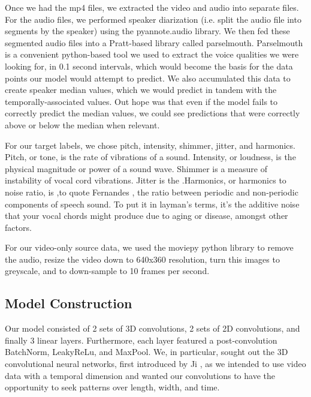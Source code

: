 \documentclass[10pt,twocolumn,letterpaper]{article}
\begin{document}
Once we had the mp4 files, we extracted the video and audio into separate files. For the audio files, we performed speaker diarization (i.e. split the audio file into segments by the speaker) using the pyannote.audio library\cite{Bredin23}. We then fed these segmented audio files into a Pratt\cite{Pratt}-based library called parselmouth\cite{Parselmouth}.  Parselmouth is a convenient python-based tool we used to extract the voice qualities we were looking for, in 0.1 second intervals, which would become the basis for the data points our model would attempt to predict. We also accumulated this data to create speaker median values, which we would predict in tandem with the temporally-associated values. Out hope was that even if the model fails to correctly predict the median values, we could see predictions that were correctly above or below the median when relevant. 

For our target labels, we chose pitch, intensity, shimmer, jitter, and harmonics. Pitch, or tone, is the rate of vibrations of a sound. Intensity, or loudness, is the physical magnitude or power of a sound wave. Shimmer is a measure of instability of vocal cord vibrations. Jitter is the .Harmonics, or harmonics to noise ratio, is ,to quote Fernandes \cite{Harmon2018}, the ratio between periodic and non-periodic components of speech sound. To put it in layman's terms, it's the additive noise that your vocal chords might produce due to aging or disease, amongst other factors.

For our video-only source data, we used the moviepy python library to remove the audio, resize the video down to 640x360 resolution, turn this images to greyscale, and to down-sample to 10 frames per second. 

\subsection{Model Construction}

Our model consisted of 2 sets of 3D convolutions, 2 sets of 2D convolutions, and finally 3 linear layers. Furthermore, each layer featured a post-convolution BatchNorm, LeakyReLu, and MaxPool. We, in particular, sought out the 3D convolutional neural networks, first introduced by Ji  \cite{Ji3DConv}, as we intended to use video data with a temporal dimension and wanted our convolutions to have the opportunity to seek patterns over length, width, and time.  


\end{document}
